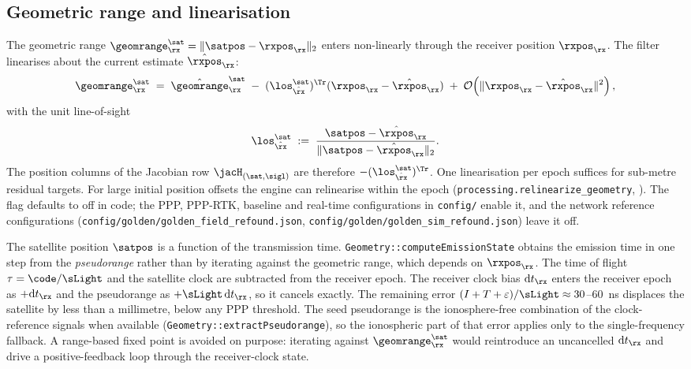 \subsection{Geometric range and linearisation}\label{sec:obs-geometry}

The geometric range $\geomrange^\sat_\rx = \|\satpos - \rxpos_\rx\|_2$
enters  non-linearly through the
receiver position $\rxpos_\rx$.  The filter linearises about the
current estimate $\hat{\rxpos}_\rx$:
\begin{equation}
\geomrange^\sat_\rx
\;=\;
\hat{\geomrange}^\sat_\rx
\;-\; (\los^\sat_{\hat{\rx}})^{\Tr} (\rxpos_\rx - \hat{\rxpos}_\rx)
\;+\; \mathcal{O}\!\left(\|\rxpos_\rx - \hat{\rxpos}_\rx\|^2\right),
\label{eq:geom-linear}
\end{equation}
with the unit line-of-sight
\begin{equation}
\los^\sat_{\hat{\rx}}
\;:=\;
\frac{\satpos - \hat{\rxpos}_\rx}{\|\satpos - \hat{\rxpos}_\rx\|_2}.
\label{eq:los}
\end{equation}
The position columns of the Jacobian row $\jacH_{(\sat,\sigl)}$ are
therefore $-(\los^\sat_{\hat{\rx}})^{\Tr}$.  One linearisation per epoch
suffices for sub-metre residual targets.  For large initial position
offsets the engine can relinearise within the epoch
(\texttt{processing.relinearize\_geometry}, ).  The flag
defaults to off in code; the PPP, PPP-RTK, baseline and real-time
configurations in \texttt{config/} enable it, and the network reference
configurations (\texttt{config/golden/golden\_field\_refound.json},
\texttt{config/golden/golden\_sim\_refound.json}) leave it off.

The satellite position $\satpos$ is a function of the transmission
time.  \texttt{Geometry::computeEmissionState} obtains the emission time
in one step from the \emph{pseudorange} rather than by iterating against
the geometric range, which depends on $\rxpos_\rx$.  The time of flight
$\tau = \code / \sLight$ and the satellite clock are subtracted from the
receiver epoch.  The receiver clock bias $\mathrm{d}t_\rx$ enters the receiver epoch as
$+\mathrm{d}t_\rx$ and the pseudorange as $+\sLight\,\mathrm{d}t_\rx$,
so it cancels exactly.  The remaining error $(I+T+\varepsilon)/\sLight
\approx 30$--$60$~ns displaces the satellite by less than a millimetre,
below any PPP threshold.  The seed pseudorange is the ionosphere-free
combination of the clock-reference signals when available
(\texttt{Geometry::extractPseudorange}), so the ionospheric part of that
error applies only to the single-frequency fallback.  A range-based fixed
point is avoided on purpose: iterating against $\geomrange^\sat_\rx$
would reintroduce an uncancelled $\mathrm{d}t_\rx$ and drive a
positive-feedback loop through the receiver-clock state.


